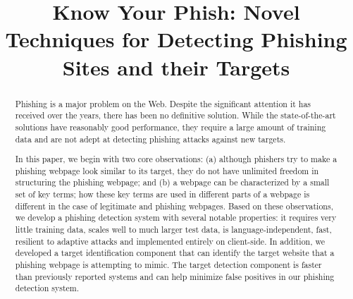 \documentclass[10pt,conference,compsocconf,letterpaper]{IEEEtran}
\begin{document}
\title{Know Your Phish: Novel Techniques for Detecting Phishing
             Sites and their Targets}







\author{
}









\maketitle
\IEEEpeerreviewmaketitle

\newcommand{\eat}[1]{}

\begin{abstract}
Phishing is a major problem on the Web. Despite the significant attention it has received over the years, there has been no definitive solution. While the state-of-the-art solutions have reasonably good performance, they require a large amount of training data and are not adept at detecting phishing attacks against new targets.

In this paper, we begin with two core observations: (a) although phishers try to make a phishing webpage look similar to its target, they do not have unlimited freedom in structuring the phishing webpage; and (b) a webpage can be characterized by a small set of key terms; how these key terms are used in different parts of a webpage is different in the case of legitimate and phishing webpages. Based on these observations, we develop a phishing detection system with several notable properties: it requires very little training data, scales well to much larger test data, is language-independent, fast, resilient to adaptive attacks and implemented entirely on client-side. In addition, we developed a target identification component that can identify the target website that a phishing webpage is attempting to mimic. The target detection component is faster than previously reported systems and can help minimize false positives in our phishing detection system.


\end{abstract}
\end{document}
